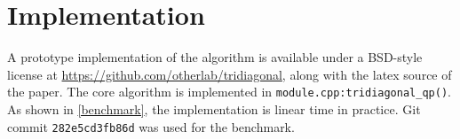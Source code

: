 \documentclass[11pt]{article}
\begin{document}
\section{Implementation}

A prototype implementation of the algorithm is available under a BSD-style license at \url{https://github.com/otherlab/tridiagonal}, along with the latex source of the paper.
The core algorithm is implemented in \verb+module.cpp:tridiagonal_qp()+.  As shown in \cref{benchmark}, the implementation is linear time in practice.  Git commit 
\verb+282e5cd3fb86d+ was used for the benchmark.



\end{document}
